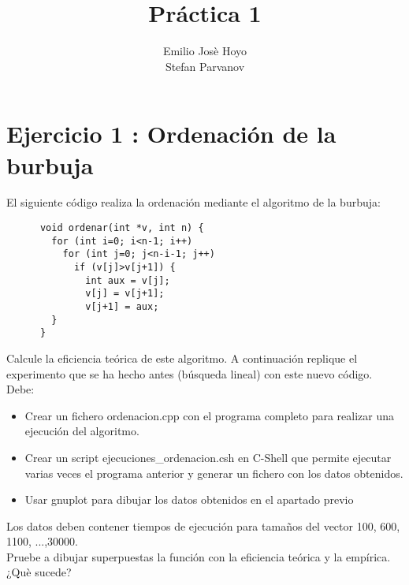 \documentclass{article}
\begin{document}
\lstset{language=C++}
\lstset{numbers=left}

\title{Práctica 1}
\author{Emilio Jos\`e Hoyo \\ Stefan Parvanov}
\maketitle

\section{Ejercicio 1 : Ordenación de la burbuja}
El siguiente código realiza la ordenación mediante el algoritmo de la burbuja:\\
\begin{lstlisting}
      void ordenar(int *v, int n) {
        for (int i=0; i<n-1; i++)
          for (int j=0; j<n-i-1; j++)
            if (v[j]>v[j+1]) {
              int aux = v[j];
              v[j] = v[j+1];
              v[j+1] = aux;
		} 
      }
\end{lstlisting}

Calcule la eficiencia teórica de este algoritmo. A continuación replique el experimento que se ha hecho antes (búsqueda lineal) con este nuevo código. Debe:
\begin{itemize}
	\item Crear un fichero ordenacion.cpp con el programa completo para realizar una ejecución del algoritmo.
	\item Crear un script ejecuciones\_ordenacion.csh en C-Shell que permite ejecutar varias veces el programa anterior y generar un fichero con los datos obtenidos.
	\item Usar gnuplot para dibujar los datos obtenidos en el apartado previo
\end{itemize}
Los datos deben contener tiempos de ejecución para tamaños del vector 100, 600, 1100, ...,30000. \\
Pruebe a dibujar superpuestas la función con la eficiencia teórica y la empírica. ¿Qu\`e sucede? 
\clearpage
\end{document}
